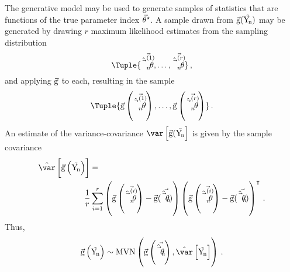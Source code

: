 \documentclass[../main.tex]{subfiles}
\begin{document}
The generative model may be used to generate samples of statistics that are functions of the true parameter index ${\vec{\theta}}^{\star}$.
A sample drawn from $\vec{\operatorname{g}}(\mathrm{\vec{Y_{\!n}}})$ may be generated by drawing $r$ maximum likelihood estimates from the sampling distribution
\begin{equation}
\Tuple{\mleui{1}, \ldots, \mleui{r}}\,,
\end{equation}
and applying $\vec{\operatorname{g}}$ to each, resulting in the sample
\begin{equation}
\label{eq:phi_sample}
\Tuple{
\vecstat\left(\mleui{1}\right),
\ldots,
\vecstat\left(\mleui{r}\right)}\,.
\end{equation}
An estimate of the variance-covariance $\var\left[\vecstat(\sampdu\right]$ is given by the sample covariance
\begin{equation}
\begin{split}
\estimator{\var}\left[\vecstat\left(\sampdu\right)\right] &=\\
& \!\!\!\! \frac{1}{r} \sum_{i=1}^{r}
\left(\vecstat\left(\mleui{i}\right) - \vecstat(\mleu)\right)
\left(\vecstat\left(\mleui{i}\right) - \vecstat(\mleu)\right)^\intercal\,.
\end{split}
\end{equation}
Thus,
\begin{equation}
\vecstat\left(\sampdu\right) \sim \mvn\left(\vecstat\left(\mleu\right), \estimator{\var}\left[\sampdu\right] \right)\,.
\end{equation}
\end{document}
